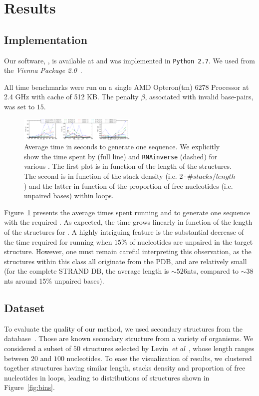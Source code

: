 \section{Results}
\label{sec:results}

\subsection{Implementation}
\label{sec:implementation}
Our software, \ourprog, is available at \oururl and was implemented in {\tt Python~2.7}. We used
\RNAinverse from the \textit{Vienna Package 2.0}~\cite{Hofacker:1994}.

All time benchmarks were run on a single AMD Opteron(tm) 6278 Processor  at 2.4 GHz with cache of 512 KB.
The penalty $\beta$, associated with invalid base-pairs, was set to $15$.

\begin{figure}[t!]
	\centering
 	\includegraphics[width=0.5\textwidth]{Figures/time_rnastrand_clustered_rnainverse_100samples_fix}
	\caption{Average time in seconds to generate one sequence. We explicitly show 
	the time spent by \ourprog (full line) and \texttt{RNAinverse} (dashed) for various \GCContent. The first plot is in function
	of the length of the structures. The second is in function of the stack
	density (i.e. $2\cdot\#stacks/length$) and the latter in function of 
	the proportion of free nucleotides (i.e. unpaired bases) within loops.}
	\label{fig:time}	
\end{figure}

Figure~\ref{fig:time} presents the average times spent running \ourprog and \RNAinverse to generate one sequence
with the required \GCContent. As expected, the time grows linearly
in function of the length of the structures for \ourprog.  A highly intriguing feature is the substantial decrease of the time 
required for running \RNAinverse when $15\%$ of nucleotides are unpaired in the target structure.
However, one must remain careful interpreting this observation, as the structures within this class all originate from the PDB, and are relatively small (for the complete STRAND DB, the average length is $\sim526$nts, compared to $\sim38$nts around 15\% unpaired bases).



\subsection{Dataset}
To evaluate the quality of our method, we used secondary
structures from the \RNASTRAND database~\cite{andronescu2008rna}.
Those are known secondary structure from a variety of organisms.
We considered a subset of $50$ structures selected by Levin~\emph{et al}~\cite{Levin:2012kx}, 
whose length ranges between $20$ and $100$ nucleotides. 
 To ease the visualization of results, we clustered together structures
 having similar length, stacks density and proportion of free nucleotides in loops, leading to distributions of structures shown in Figure~\ref{fig:bins}.


